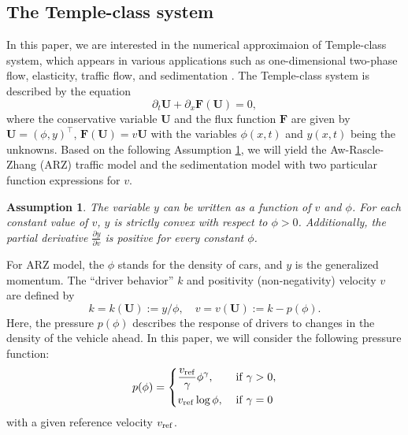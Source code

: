 \documentclass[times,final,11pt]{elsarticle}
\newtheorem{assumption}{Assumption}
\numberwithin{equation}{section}
\theoremstyle{definition}
\theoremstyle{remark}
\begin{document}
\subsection{The Temple-class system}\label{sec2}

In this paper, we are interested in the numerical approximaion of Temple-class system, which appears in various applications such as one-dimensional two-phase flow, elasticity, traffic flow, and sedimentation \cite{gu2012existence, keyfitz1980system,temple1982global,klingenberg2001stability,betancourt2014modeling,zhang2002non,betancourt2018random,aw2000resurrection}. 
The Temple-class system is described by the equation
\begin{equation}\label{TC}
    \partial_t \mathbf{U} + \partial_x \mathbf{F}(\mathbf{U}) = 0,
\end{equation}
where the conservative variable $\mathbf{U}$ and the flux function $\mathbf{F}$ are given by $\mathbf{U} = (\phi, y)^\top$, $\mathbf{F}(\mathbf{U}) = v \mathbf{U}$ with the variables $\phi(x, t)$ and $y(x, t)$ being the unknowns. 
Based on the following Assumption \ref{assum1}, we will yield the Aw-Rascle-Zhang (ARZ) traffic model \cite{aw2000resurrection,zhang2002non} and the sedimentation model \cite{betancourt2018random,betancourt2014modeling} with two particular function expressions for $v$.
\begin{assumption}
\label{assum1}
	The variable $y$ can be written as a function of $v$ and $\phi$. For each constant value of $v$, $y$ is strictly convex with respect to $\phi > 0$. Additionally, the partial derivative $\frac{\partial y}{\partial v}$ is positive for every constant $\phi$.
\end{assumption}

For ARZ model, the $\phi$ stands for the density of cars, and $y$ is the generalized momentum. The ``driver behavior'' $k$ and positivity (non-negativity) velocity $v$ are defined by
\begin{equation*} 
	\label{kv}
	k = k(\mathbf{U}) := y/\phi, \quad v = v(\mathbf{U}) := k - p(\phi).
\end{equation*}
Here, the pressure $p(\phi)$ describes the response of drivers to changes in the density of the vehicle ahead. In this paper, we will consider the following pressure function:
\begin{equation*}\label{P}
    p(\phi) = \left\{
    \begin{aligned}
        & \frac{v_{\rm ref}}{\gamma} \phi^\gamma, \; && {\rm if} \; \gamma > 0, \\
        & v_{\rm ref} \log{\phi}, \; && {\rm if} \; \gamma = 0
    \end{aligned}
    \right.
\end{equation*}
with a given reference velocity $v_{\rm ref}$.
\end{document}
